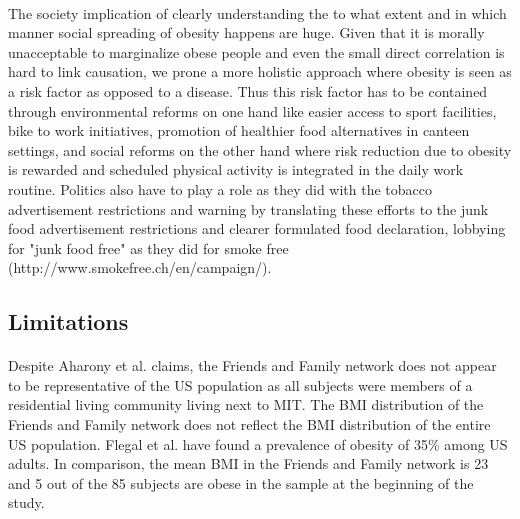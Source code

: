 \documentclass[11pt]{article}
\begin{document}
\paragraph{}
The society implication of clearly understanding the to what extent and in which manner social spreading of obesity happens are huge. Given that it is morally unacceptable to marginalize obese people and even the small direct correlation is hard to link causation, we prone a more holistic approach where obesity is seen as a risk factor as opposed to a disease. Thus this risk factor has to be contained through environmental reforms on one hand like easier access to sport facilities, bike to work initiatives, promotion of healthier food alternatives in canteen settings, and social reforms on the other hand where risk reduction due to obesity is rewarded and scheduled physical activity is integrated in the daily work routine. Politics also have to play a role as they did with the tobacco advertisement restrictions and warning by translating these efforts to the junk food advertisement restrictions and clearer formulated food declaration, lobbying for "junk food free" as they did for smoke free (http://www.smokefree.ch/en/campaign/).

\subsection{Limitations}
\paragraph{}
Despite Aharony et al. claims, the Friends and Family network does not appear to be representative of the US population as all subjects were members of a residential living community living next to MIT. The BMI distribution of the Friends and Family network does not reflect the BMI distribution of the entire US population. Flegal et al. have found a prevalence of obesity of 35\% among US adults. In comparison, the mean BMI in the Friends and Family network is 23 and 5 out of the 85 subjects are obese in the sample at the beginning of the study.
\end{document}
